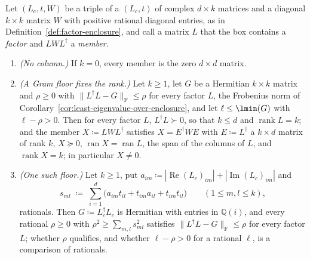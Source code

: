 \begin{corollary}\label{cor:rank-over-factor-enclosure}
Let $(L_c,t,W)$ be a triple of a  $(L_c,t)$ of complex
$d\times k$ matrices and a diagonal $k\times k$ matrix $W$ with positive
rational diagonal entries, as in Definition~\ref{def:factor-enclosure}, and
call a matrix $L$ that the box contains a \emph{factor} and $LWL^{\dagger}$ a
\emph{member}.
\begin{enumerate}[label=(\roman*),leftmargin=2.4em]
\item \emph{(No column.)} If $k=0$, every member is the zero $d\times d$
  matrix.
\item \emph{(A Gram floor fixes the rank.)} Let $k\ge1$, let $G$ be a
  Hermitian $k\times k$ matrix and $\rho\ge0$ with
  $\|L^{\dagger}L-G\|_{\mathrm F}\le\rho$ for every factor $L$, the Frobenius
  norm of Corollary~\ref{cor:least-eigenvalue-over-enclosure}, and let
  $\ell\le\lmin(G)$ with $\ell-\rho>0$. Then for every factor $L$,
  $L^{\dagger}L\succ0$, so that $k\le d$ and $\operatorname{rank}L=k$; and the
  member $X\coloneqq LWL^{\dagger}$ satisfies $X=E^{\dagger}WE$ with
  $E\coloneqq L^{\dagger}$ a $k\times d$ matrix of rank $k$, $X\succeq0$,
  $\operatorname{ran}X=\operatorname{ran}L$, the span of the columns of $L$,
  and $\operatorname{rank}X=k$; in particular $X\neq0$.
\item \emph{(One such floor.)} Let $k\ge1$, put
  $a_{im}\coloneqq|\operatorname{Re}(L_c)_{im}|+|\operatorname{Im}(L_c)_{im}|$
  and
  \begin{equation}\label{eq:gram-radius}
    s_{ml}\;\coloneqq\;\sum_{i=1}^{d}\big(a_{im}t_{il}+t_{im}a_{il}
    +t_{im}t_{il}\big)\qquad(1\le m,l\le k),
  \end{equation}
  rationals. Then $G\coloneqq L_c^{\dagger}L_c$ is Hermitian with entries in
  $\mathbb{Q}(i)$, and every rational $\rho\ge0$ with
  $\rho^{2}\ge\sum_{m,l}s_{ml}^{2}$ satisfies
  $\|L^{\dagger}L-G\|_{\mathrm F}\le\rho$ for every factor $L$; whether $\rho$
  qualifies, and whether $\ell-\rho>0$ for a rational $\ell$, is a comparison
  of rationals.
\end{enumerate}
\end{corollary}

